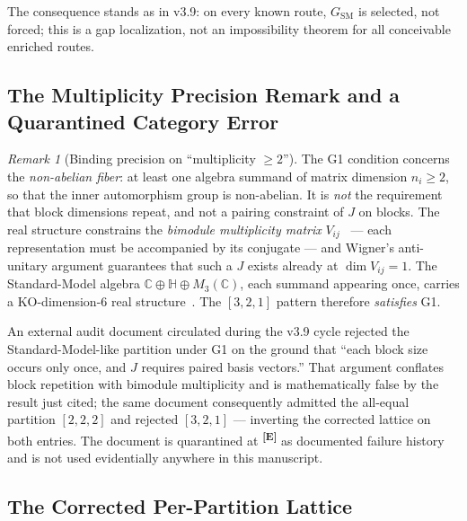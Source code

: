 \documentclass[12pt,a4paper,twoside]{article}
\theoremstyle{plain}
\theoremstyle{definition}
\theoremstyle{remark}
\newtheorem{remark}[theorem]{Remark}
\newcommand{\catmark}[1]{\textsuperscript{\textsf{\textbf{[#1]}}}}
\begin{document}
The consequence stands as in v3.9: on every known
route, $G_{\mathrm{SM}}$ is selected, not forced; this is a gap
localization, not an impossibility theorem for all conceivable enriched
routes.

\subsection{The Multiplicity Precision Remark and a Quarantined Category Error}
\label{subsec:multiplicity-precision}

\begin{remark}[Binding precision on ``multiplicity $\geq 2$'']
\label{rem:multiplicity}
The G1 condition concerns the \emph{non-abelian fiber}: at least one
algebra summand of matrix dimension $n_i \geq 2$, so that the inner
automorphism group is non-abelian. It is \emph{not} the requirement that
block dimensions repeat, and not a pairing constraint of $J$ on blocks.
The real structure constrains the \emph{bimodule multiplicity matrix}
$V_{ij}$~\cite{krajewski1998,paschkesitarz1998,cacic2011} --- each representation must be accompanied by its conjugate ---
and Wigner's anti-unitary argument guarantees that such a $J$ exists
already at $\dim V_{ij} = 1$. The Standard-Model algebra
$\mathbb C \oplus \mathbb H \oplus M_3(\mathbb C)$, each summand appearing
once, carries a KO-dimension-6 real structure~\cite{ccm2007,vansuijlekom2019}. The $[3,2,1]$ pattern
therefore \emph{satisfies} G1.
\end{remark}

An external audit document circulated during the v3.9 cycle rejected the
Standard-Model-like partition under G1 on the ground that ``each block
size occurs only once, and $J$ requires paired basis vectors.'' That
argument conflates block repetition with bimodule multiplicity and is
mathematically false by the result just cited; the same document
consequently admitted the all-equal partition $[2,2,2]$ and rejected
$[3,2,1]$ --- inverting the corrected lattice on both entries. The
document is quarantined at \catmark{E} as documented failure history and
is not used evidentially anywhere in this manuscript.

\subsection{The Corrected Per-Partition Lattice}
\label{subsec:corrected-lattice}
\end{document}
